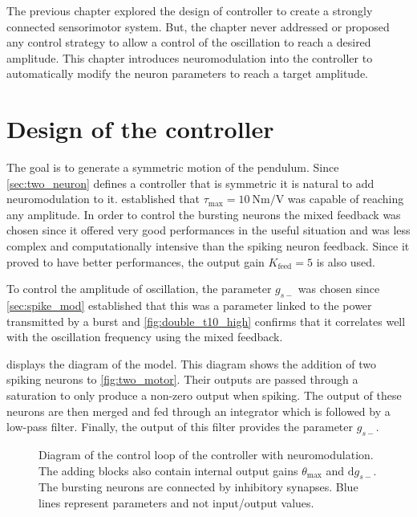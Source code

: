 The previous chapter explored the design of controller to create a strongly connected sensorimotor system.
But, the chapter never addressed or proposed any control strategy to allow a control of the oscillation to reach a desired amplitude. 
This chapter introduces neuromodulation into the controller to automatically modify the neuron parameters to reach a target amplitude.

\section{Design of the controller}

The goal is to generate a symmetric motion of the pendulum.
Since \cref{sec:two_neuron} defines a controller that is symmetric it is natural to add neuromodulation to it.
 established that $\tau_\text{max} = \qty{10}{\newton\meter\per\volt}$ was capable of reaching any amplitude.
In order to control the bursting neurons the mixed feedback was chosen since it offered very good performances in the useful situation and was less complex and computationally intensive than the spiking neuron feedback.
Since it proved to have better performances, the output gain $K_\text{feed} = 5$ is also used.

To control the amplitude of oscillation, the parameter $g_{s-}$ was chosen since \cref{sec:spike_mod} established that this was a parameter linked to the power transmitted by a burst and \cref{fig:double_t10_high} confirms that it correlates well with the oscillation frequency using the mixed feedback. 

 displays the diagram of the model. 
This diagram shows the addition of two spiking neurons to \cref{fig:two_motor}.
Their outputs are passed through a saturation to only produce a non-zero output when spiking. 
The output of these neurons are then merged and fed through an integrator which is followed by a low-pass filter. 
Finally, the output of this filter provides the parameter $g_{s-}$.
 
\begin{figure}[!htbp]
    \centering
    \caption{Diagram of the control loop of the controller with neuromodulation. The adding blocks also contain internal output gains $\theta_\text{max}$ and $\mathrm{d}g_{s-}$. The bursting neurons are connected by inhibitory synapses. Blue lines represent parameters and not input/output values.}
    \label{fig:neuromod_motor}
\end{figure}

